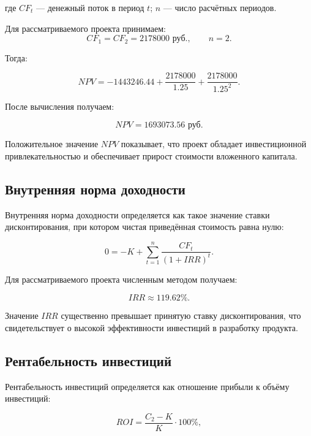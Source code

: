 где $CF_t$ --- денежный поток в период $t$; $n$ --- число расчётных
периодов.

Для рассматриваемого проекта принимаем:
\[
CF_1 = CF_2 = 2178000 \text{ руб.}, \qquad n = 2.
\]

Тогда:

\begin{equation}
NPV = -1443246.44 + \frac{2178000}{1.25} +
\frac{2178000}{1.25^2}.
\end{equation}

После вычисления получаем:

\begin{equation}
NPV = 1693073.56 \text{ руб.}
\end{equation}

Положительное значение $NPV$ показывает, что проект обладает
инвестиционной привлекательностью и обеспечивает прирост стоимости
вложенного капитала.

\subsection*{Внутренняя норма доходности}

Внутренняя норма доходности определяется как такое значение ставки
дисконтирования, при котором чистая приведённая стоимость равна нулю:

\begin{equation}
0 = -K + \sum_{t=1}^{n} \frac{CF_t}{(1+IRR)^t}.
\end{equation}

Для рассматриваемого проекта численным методом получаем:

\begin{equation}
IRR \approx 119.62\%.
\end{equation}

Значение $IRR$ существенно превышает принятую ставку дисконтирования,
что свидетельствует о высокой эффективности инвестиций в разработку
продукта.

\subsection*{Рентабельность инвестиций}

Рентабельность инвестиций определяется как отношение прибыли к объёму
инвестиций:

\begin{equation}
ROI = \frac{C_{2} - K}{K}\cdot 100\%,
\end{equation}


